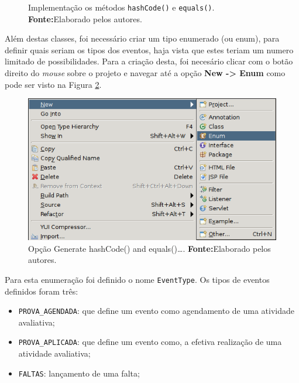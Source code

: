	\begin{figure}[h!]
		
		\caption[Implementação os métodos hashCode() e equals()]{Implementação os
		métodos \texttt{hashCode()} e \texttt{equals()}.
			\textbf{Fonte:}Elaborado pelos autores.}
		\label{fig:desws15}
	\end{figure}

	\pagebreak
	
	
	\par Além destas classes, foi necessário criar um tipo enumerado (ou enum),
para definir quais seriam os tipos dos eventos, haja vista que estes teriam um
numero limitado de possibilidades. Para a criação desta, foi necesário clicar
com o botão direito do \textit{mouse} sobre o projeto e navegar até a opção
\textbf{New -> Enum} como pode ser visto na Figura \ref{fig:desws16}.
	
	\begin{figure}[h!]
		\centerline{\includegraphics[scale=0.8]{./imagens/2_q_metodologico/4_procedimentos_resultados/43_webservice/432_desenvolvimento/desws16.png}}
		\caption[Opção Generate hashCode() and equals()\ldots]{Opção Generate
		hashCode() and equals()\ldots .
			\textbf{Fonte:}Elaborado pelos autores.}
		\label{fig:desws16}
	\end{figure}

	\pagebreak
	
	\par Para esta enumeração foi definido o nome \texttt{EventType}. Os tipos de
eventos definidos foram três:

	\begin{itemize}
	  \item \texttt{PROVA\_AGENDADA}: que define um evento como agendamento de uma
	  atividade avaliativa;
	  \item \texttt{PROVA\_APLICADA}: que define um evento como, a efetiva
	  realização de uma atividade avaliativa;
	  \item \texttt{FALTAS}: lançamento de uma falta;
	\end{itemize}
	
